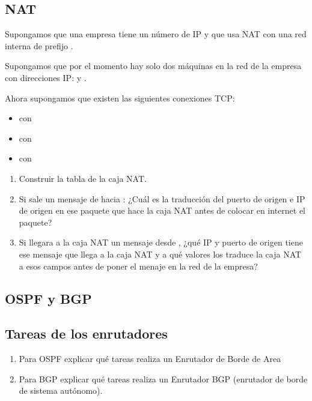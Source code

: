 \documentclass[12pt]{report}
\begin{document}
\begin{exer}
	\section{NAT \sfour}
	Supongamos que una empresa tiene un número de IP  y que usa NAT con una red interna de prefijo .

	Supongamos que por el momento hay solo dos máquinas en la red de la empresa con direcciones IP:  y .

	Ahora supongamos que existen las siguientes conexiones TCP:

	\begin{itemize}
		\item {} con 
		\item {} con 
		\item {} con 
	\end{itemize}

	\begin{enumerate}
		\item Construir la tabla de la caja NAT.
		\item Si sale un mensaje de  hacia : ¿Cuál es la traducción del
		      puerto de origen e IP de origen en ese paquete que hace la caja NAT antes de colocar en internet el paquete?
		\item Si llegara a la caja NAT un mensaje desde , ¿qué IP y puerto de origen tiene
		      ese mensaje que llega a la caja NAT y a qué valores los traduce la caja NAT a esos campos
		      antes de poner el menaje en la red de la empresa?
	\end{enumerate}
\end{exer}

\begin{exer}
	\section{OSPF y BGP}
	\subsection{Tareas de los enrutadores \stwo \steo}
	\begin{enumerate}
		\item Para OSPF explicar qué tareas realiza un Enrutador de Borde de Area
		\item Para BGP explicar qué tareas realiza un Enrutador BGP (enrutador de borde de sistema autónomo).
	\end{enumerate}
\end{exer}
\end{document}
